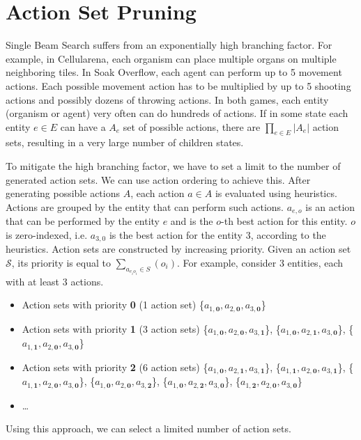 \documentclass[shortabstract, mgr, english]{iithesis}
\begin{document}
\section{Action Set Pruning}
Single Beam Search suffers from an exponentially high branching factor. For example, in Cellularena, each organism can place multiple organs on multiple neighboring tiles. In Soak Overflow, each agent can perform up to 5 movement actions. Each possible movement action has to be multiplied by up to 5 shooting actions and possibly dozens of throwing actions. In both games, each entity (organism or agent) very often can do hundreds of actions. If in some state each entity $e \in E$ can have a $A_e$ set of possible actions, there are $\prod_{e\in E} {|A_e|}$ action sets, resulting in a very large number of children states. 

To mitigate the high branching factor, we have to set a limit to the number of generated action sets. We can use action ordering to achieve this. After generating possible actions $A$, each action $a \in A$ is evaluated using heuristics. Actions are grouped by the entity that can perform such actions. $a_{e,o}$ is an action that can be performed by the entity $e$ and is the $o$-th best action for this entity. $o$ is zero-indexed, i.e. $a_{3,0}$ is the best action for the entity $3$, according to the heuristics.
Action sets are constructed by increasing priority. Given an action set $\mathcal{S}$, its priority is equal to $\sum_{a_{{e_i}{o_i}}\in S}({o_i})$.
For example, consider 3 entities, each with at least 3 actions.

\begin{itemize}[itemsep=1\itemsep,parsep=1\parsep,partopsep=1\partopsep,topsep=1\topsep]
    \item Action sets with priority \textbf{0} (1 action set) \{$a_{1,\textbf{0}}, a_{2,\textbf{0}}, a_{3,\textbf{0}}$\}
    \item Action sets with priority \textbf{1} (3 action sets) \{$a_{1,\textbf{0}}, a_{2,\textbf{0}}, a_{3,\textbf{1}}$\}, \{$a_{1,\textbf{0}}, a_{2,\textbf{1}}, a_{3,\textbf{0}}$\}, \{$a_{1,\textbf{1}}, a_{2,\textbf{0}}, a_{3,\textbf{0}}$\}
    \item Action sets with priority \textbf{2} (6 action sets) \{$a_{1,\textbf{0}}, a_{2,\textbf{1}}, a_{3,\textbf{1}}$\}, \{$a_{1,\textbf{1}}, a_{2,\textbf{0}}, a_{3,\textbf{1}}$\}, \{$a_{1,\textbf{1}}, a_{2,\textbf{0}}, a_{3,\textbf{0}}$\}, \{$a_{1,\textbf{0}}, a_{2,\textbf{0}}, a_{3,\textbf{2}}$\}, \{$a_{1,\textbf{0}}, a_{2,\textbf{2}}, a_{3,\textbf{0}}$\}, \{$a_{1,\textbf{2}}, a_{2,\textbf{0}}, a_{3,\textbf{0}}$\}
    \item \ldots
\end{itemize}
Using this approach, we can select a limited number of action sets.
\end{document}

